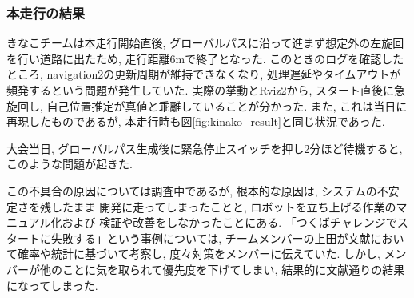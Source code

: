 \subsubsection{本走行の結果}
きなこチームは本走行開始直後, グローバルパスに沿って進まず想定外の左旋回を行い道路に出たため, 走行距離6mで終了となった. 
このときのログを確認したところ, navigation2の更新周期が維持できなくなり, 処理遅延やタイムアウトが頻発するという問題が発生していた.
実際の挙動とRviz2から, スタート直後に急旋回し, 自己位置推定が真値と乖離していることが分かった.  
また, これは当日に再現したものであるが, 本走行時も図\ref{fig:kinako_result}と同じ状況であった. 

大会当日, グローバルパス生成後に緊急停止スイッチを押し2分ほど待機すると, このような問題が起きた. 

この不具合の原因については調査中であるが, 
根本的な原因は, システムの不安定さを残したまま
開発に走ってしまったことと, 
ロボットを立ち上げる作業のマニュアル化および
検証や改善をしなかったことにある. 
「つくばチャレンジでスタートに失敗する」という事例については, 
チームメンバーの上田が文献\cite{上田確率}において確率や統計に基づいて考察し, 
度々対策をメンバーに伝えていた. しかし, 
メンバーが他のことに気を取られて優先度を下げてしまい, 
結果的に文献通りの結果になってしまった. 


